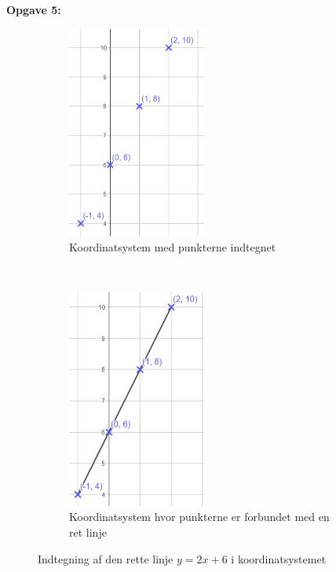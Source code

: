 \newpage

\textbf{Opgave 5:}

\begin{figure}[ht]
    \centering
    \begin{subfigure}[t]{0.5\textwidth}
        \centering
        \includegraphics[width=0.5\textwidth, height=0.8\textwidth]{img_11}
        \caption{Koordinatsystem med punkterne indtegnet}
    \end{subfigure}%
    ~ 
    \begin{subfigure}[t]{0.5\textwidth}
        \centering
        \includegraphics[width=0.5\textwidth, height=0.8\textwidth]{img_12}
        \caption{Koordinatsystem hvor punkterne er forbundet med en ret linje}
    \end{subfigure}
    \caption{Indtegning af den rette linje $y = 2x + 6 $ i koordinatsystemet}
\end{figure}
